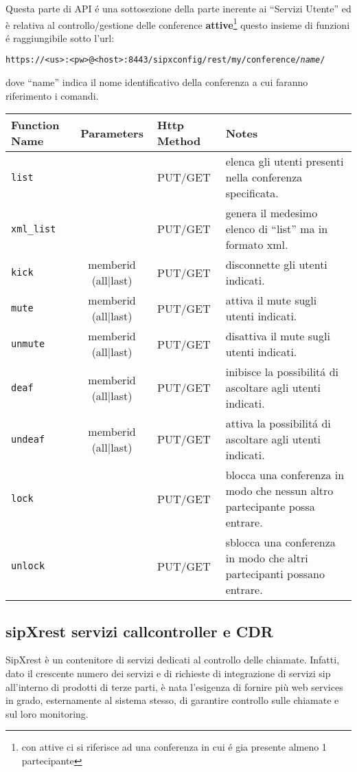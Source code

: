 Questa parte di API \'e una sottosezione della parte inerente ai ``Servizi Utente'' ed \`e relativa al controllo/gestione delle conference 
\textbf{attive}\footnote{con attive ci si riferisce ad una conferenza in cui \'e gia presente almeno 1 partecipante}
questo insieme di funzioni \'e raggiungibile sotto l'url:

\bigskip

\texttt{https://<us>:<pw>@<host>:8443/sipxconfig/rest/my/conference/\emph{name}/}

dove ``name'' indica il nome identificativo della conferenza a cui faranno riferimento i comandi.

\bigskip

\begin{tabular}[c]{l | c || l || p{5cm}}
Function Name & Parameters & Http Method & Notes \\
\hline \hline
\texttt{list} & & PUT/GET & elenca gli utenti presenti nella conferenza specificata.\\ \hline
\texttt{xml\_list} & & PUT/GET & genera il medesimo elenco di ``list'' ma in formato xml. \\ \hline
\texttt{kick} & memberid (all|last) & PUT/GET & disconnette gli utenti indicati. \\ \hline
\texttt{mute} & memberid (all|last) & PUT/GET & attiva il mute sugli utenti indicati. \\ \hline
\texttt{unmute} & memberid (all|last) & PUT/GET & disattiva il mute sugli utenti indicati. \\ \hline
\texttt{deaf} & memberid (all|last) & PUT/GET & inibisce la possibilit\'a di ascoltare agli utenti indicati. \\ \hline
\texttt{undeaf} & memberid (all|last) & PUT/GET & attiva la possibilit\'a di ascoltare agli utenti indicati. \\ \hline
\texttt{lock} & & PUT/GET & blocca una conferenza in modo che nessun altro partecipante possa entrare. \\ \hline
\texttt{unlock} & & PUT/GET & sblocca una conferenza in modo che altri partecipanti possano entrare. \\ \hline
\end{tabular}


\subsection{sipXrest servizi callcontroller e CDR }
SipXrest \`e un contenitore di servizi dedicati al controllo delle chiamate. Infatti, dato il crescente numero dei servizi e di richieste di integrazione di servizi sip all'interno di prodotti di terze parti, \`e nata l'esigenza di fornire pi\`u web services in grado, esternamente al sistema stesso, di garantire controllo sulle chiamate e sul loro monitoring.

